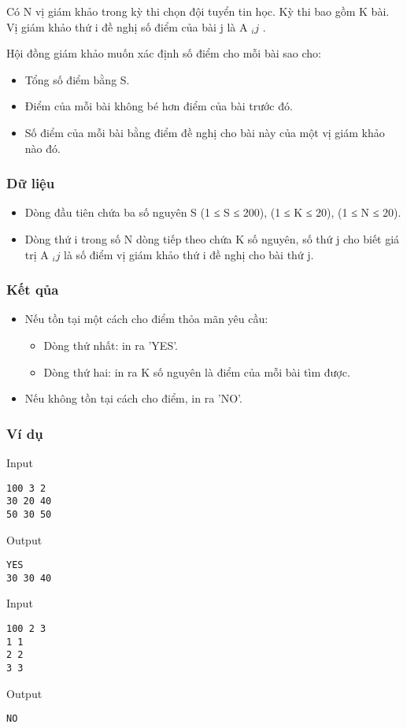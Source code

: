 

Có N vị giám khảo trong kỳ thi chọn đội tuyển tin học. Kỳ thi bao gồm K bài. Vị giám khảo thứ i đề nghị số điểm của bài j là A $_ ij $ .

Hội đồng giám khảo muốn xác định số điểm cho mỗi bài sao cho:
\begin{itemize}
	\item Tổng số điểm bằng S.
	\item Điểm của mỗi bài không bé hơn điểm của bài trước đó.
	\item Số điểm của mỗi bài bằng điểm đề nghị cho bài này của một vị giám khảo nào đó.
\end{itemize}

\subsubsection{Dữ liệu}
\begin{itemize}
	\item Dòng đầu tiên chứa ba số nguyên S (1 ≤ S ≤ 200), (1 ≤ K ≤ 20), (1 ≤ N ≤ 20).
	\item Dòng thứ i trong số N dòng tiếp theo chứa K số nguyên, số thứ j cho biết giá trị A $_ ij $ là số điểm vị giám khảo thứ i đề nghị cho bài thứ j.
\end{itemize}

\subsubsection{Kết qủa}
\begin{itemize}
	\item Nếu tồn tại một cách cho điểm thỏa mãn yêu cầu:
\begin{itemize}
	\item Dòng thứ nhất: in ra 'YES'.
	\item Dòng thứ hai: in ra K số nguyên là điểm của mỗi bài tìm được.
\end{itemize}
	\item Nếu không tồn tại cách cho điểm, in ra 'NO'.
\end{itemize}

\subsubsection{Ví dụ}

Input
\begin{verbatim}
100 3 2
30 20 40
50 30 50\end{verbatim}

Output
\begin{verbatim}
YES
30 30 40\end{verbatim}

Input
\begin{verbatim}
100 2 3
1 1
2 2
3 3\end{verbatim}

Output
\begin{verbatim}
NO\end{verbatim}